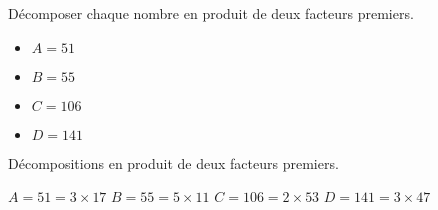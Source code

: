 \begin{exercice*}
    \label{N2exosBase012}
    Décomposer chaque nombre en produit de deux facteurs premiers.
    \begin{itemize}
        \item[] $A=51$
        \item[] $B=55$
        \item[] $C=106$
        \item[] $D=141$
    \end{itemize}
\end{exercice*}
\begin{corrige}
    Décompositions en produit de deux facteurs premiers.
    
    \begin{itemize}
        \def\item{}
        \item $A=51 =3\times 17$
        \item $B=55 =5\times 11$
        \item $C=106=2\times 53$
        \item $D=141=3\times 47$
    \end{itemize}    
\end{corrige}

